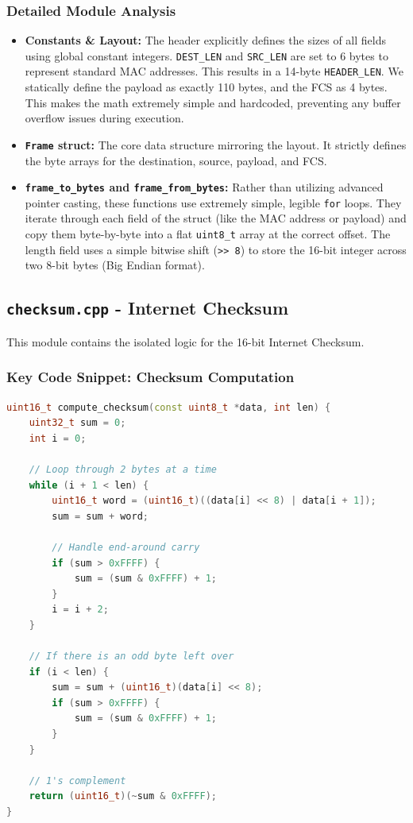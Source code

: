 \documentclass[12pt, a4paper]{article}
\begin{document}
\subsubsection{Detailed Module Analysis}
\begin{itemize}
    \item \textbf{Constants \& Layout:} The header explicitly defines the sizes of all fields using global constant integers. \texttt{DEST\_LEN} and \texttt{SRC\_LEN} are set to 6 bytes to represent standard MAC addresses. This results in a 14-byte \texttt{HEADER\_LEN}. We statically define the payload as exactly 110 bytes, and the FCS as 4 bytes. This makes the math extremely simple and hardcoded, preventing any buffer overflow issues during execution.
    \item \textbf{\texttt{Frame} struct:} The core data structure mirroring the layout. It strictly defines the byte arrays for the destination, source, payload, and FCS.
    \item \textbf{\texttt{frame\_to\_bytes} and \texttt{frame\_from\_bytes}:} Rather than utilizing advanced pointer casting, these functions use extremely simple, legible \texttt{for} loops. They iterate through each field of the struct (like the MAC address or payload) and copy them byte-by-byte into a flat \texttt{uint8\_t} array at the correct offset. The length field uses a simple bitwise shift (\texttt{>> 8}) to store the 16-bit integer across two 8-bit bytes (Big Endian format).
\end{itemize}

\subsection{\texttt{checksum.cpp} - Internet Checksum}
This module contains the isolated logic for the 16-bit Internet Checksum.

\subsubsection{Key Code Snippet: Checksum Computation}
\begin{lstlisting}[language=C++]
uint16_t compute_checksum(const uint8_t *data, int len) {
    uint32_t sum = 0;
    int i = 0;
    
    // Loop through 2 bytes at a time
    while (i + 1 < len) {
        uint16_t word = (uint16_t)((data[i] << 8) | data[i + 1]);
        sum = sum + word;
        
        // Handle end-around carry
        if (sum > 0xFFFF) {
            sum = (sum & 0xFFFF) + 1;
        }
        i = i + 2;
    }
    
    // If there is an odd byte left over
    if (i < len) {
        sum = sum + (uint16_t)(data[i] << 8);
        if (sum > 0xFFFF) {
            sum = (sum & 0xFFFF) + 1;
        }
    }
    
    // 1's complement
    return (uint16_t)(~sum & 0xFFFF);
}
\end{lstlisting}
\end{document}
